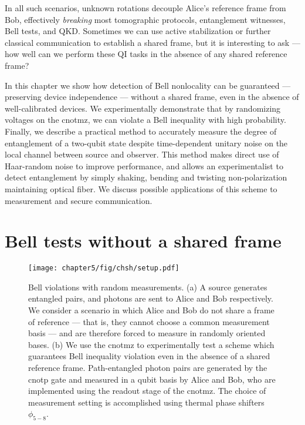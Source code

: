 In all such scenarios, unknown rotations decouple Alice's reference frame from Bob, effectively \emph{breaking} most tomographic protocols, entanglement witnesses, Bell tests, and QKD. Sometimes we can use active stabilization or further classical communication to establish a shared frame, but it is interesting to ask --- how well can we perform these QI tasks in the absence of any shared reference frame?

In this chapter we show how detection of Bell nonlocality can be guaranteed --- preserving device independence --- without a shared frame, even in the absence of well-calibrated devices. We experimentally demonstrate that by randomizing voltages on the \acrshort{cnotmz}, we can violate a Bell inequality with high probability.  Finally, we describe a practical method to accurately measure the degree of entanglement of a two-qubit state despite time-dependent unitary noise on the local channel between source and observer. This method makes direct use of Haar-random noise to improve performance,  and allows an experimentalist to detect entanglement by simply shaking, bending and twisting non-polarization maintaining optical fiber. We discuss possible applications of this scheme to measurement and secure communication.

\section{Bell tests without a shared frame} 
\label{sec:random-chsh-calibrated}

\begin{figure}[!t]
\centering
\texttt{[image: chapter5/fig/chsh/setup.pdf]}
\caption[Experimental setup]{
\label{fig:random-chsh-setup}  
Bell violations with random measurements. (a)
A source generates entangled pairs, and photons are sent to Alice and Bob respectively. We consider a scenario in which Alice and Bob do not share a frame of reference --- that is, they cannot choose a common measurement basis --- and are therefore forced to measure in randomly oriented bases. (b) We use the \acrshort{cnotmz} to experimentally test a scheme which guarantees Bell inequality violation even in the absence of a shared reference frame. Path-entangled photon pairs are generated by the \acrshort{cnotp} gate and measured in a qubit basis by Alice and Bob, who are implemented using the readout stage of the \acrshort{cnotmz}. The choice of measurement setting is accomplished using thermal phase shifters $\phi_{5-8}$. 
} 
\end{figure}


